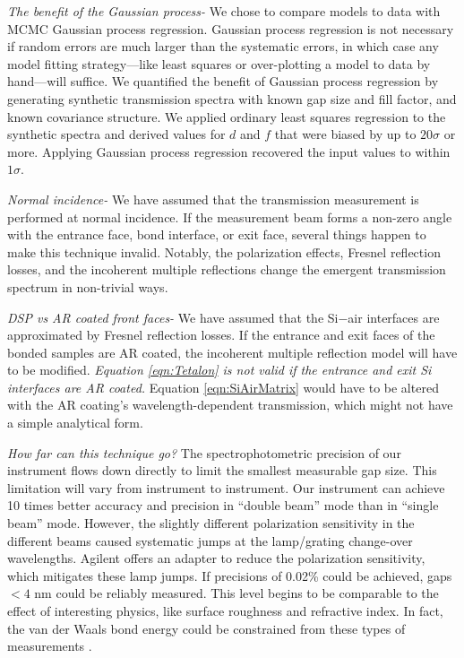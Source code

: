 \documentclass[osajnl,twocolumn,showpacs,superscriptaddress,11pt]{revtex4-1} %
\begin{document}
\emph{The benefit of the Gaussian process-} We chose to compare models to data with MCMC Gaussian process regression.  Gaussian process regression is not necessary if random errors are much larger than the systematic errors, in which case any model fitting strategy---like least squares or over-plotting a model to data by hand---will suffice.  We quantified the benefit of Gaussian process regression by generating synthetic transmission spectra with known gap size and fill factor, and known covariance structure.  We applied ordinary least squares regression to the synthetic spectra and derived values for $d$ and $f$ that were biased by up to $20\sigma$ or more.  Applying Gaussian process regression recovered the input values to within $1\sigma$.

\emph{Normal incidence- } We have assumed that the transmission measurement is performed at normal incidence.  If the measurement beam forms a non-zero angle with the entrance face, bond interface, or exit face, several things happen to make this technique invalid.  Notably, the polarization effects, Fresnel reflection losses, and the incoherent multiple reflections change the emergent transmission spectrum in non-trivial ways.

\emph{DSP vs AR coated front faces- } We have assumed that the Si$-$air interfaces are approximated by Fresnel reflection losses.  If the entrance and exit faces of the bonded samples are AR coated, the incoherent multiple reflection model will have to be modified.  \emph{Equation \ref{eqn:Tetalon} is not valid if the entrance and exit Si interfaces are AR coated.}  Equation \ref{eqn:SiAirMatrix} would have to be altered with the AR coating's wavelength-dependent transmission, which might not have a simple analytical form.

\emph{How far can this technique go?}  The spectrophotometric precision of our instrument flows down directly to limit the smallest measurable gap size.  This limitation will vary from instrument to instrument.  Our instrument can achieve 10 times better accuracy and precision in ``double beam'' mode than in ``single beam'' mode.  However, the slightly different polarization sensitivity in the different beams caused systematic jumps at the lamp/grating change-over wavelengths.  Agilent offers an adapter to reduce the polarization sensitivity, which mitigates these lamp jumps.  If precisions of 0.02\% could be achieved, gaps $<4$ nm could be reliably measured.  This level begins to be comparable to the effect of interesting physics, like surface roughness and refractive index.  In fact, the van der Waals bond energy could be constrained from these types of measurements \cite{2001JOptA...3...85G}.
\end{document}
